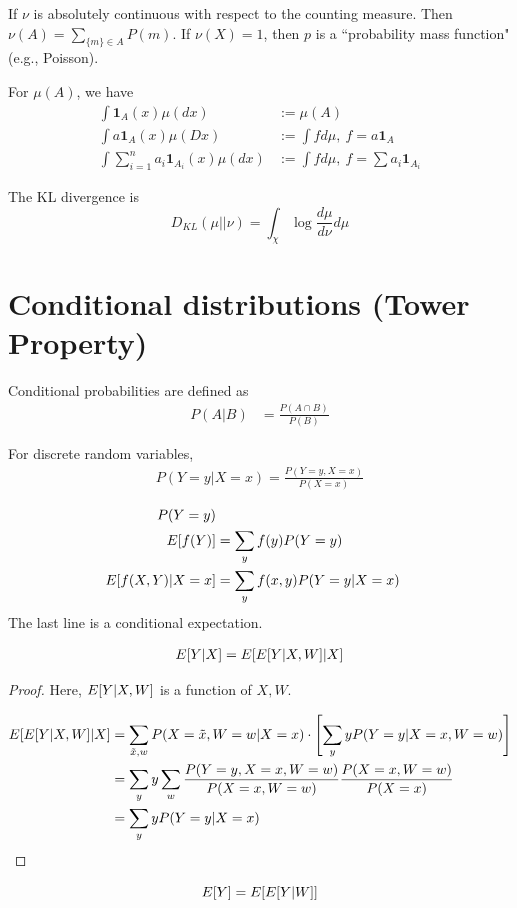 \documentclass[twoside]{article}
\begin{document}
\begin{example}
  If $\nu$ is absolutely continuous with respect to the counting measure. Then $\nu(A)
  = \sum_{\{m\} \in A} P(m)$.  If $\nu(X) = 1$, then $p$ is a ``probability mass
  function" (e.g., Poisson).
\end{example}

For $\mu(A)$, we have
\begin{align*}
   \int \mathbf{1}_A(x) \mu(dx) &:= \mu(A) \\
   \int a \mathbf{1}_A(x) \mu(Dx) &:= \int f d\mu,\ f = a \mathbf{1}_A \\
   \int \sum_{i=1}^n a_i \mathbf{1}_{A_i}(x) \mu(dx) &:= \int f d\mu,\ f = \sum
   a_i \mathbf{1}_{A_i}
\end{align*}

\begin{definition}
  The KL divergence is
  \[ D_{KL}(\mu || \nu) = \int_\chi \log \frac{d\mu}{d\nu} d\mu \]
\end{definition}

\section{Conditional distributions (Tower Property)}

Conditional probabilities are defined as
\begin{align*}
  P(A | B) &= \frac{P(A \cap B)}{P(B)} 
\end{align*}

For discrete random variables,
\begin{align*}
  P(Y = y | X = x) = \frac{P(Y = y, X = x)}{P(X = x)}
\end{align*}

\begin{align*}
  P(Y = y) \\
  E[f(Y)] &= \sum_y f(y) P(Y = y) \\
  E[f(X, Y) | X = x] &= \sum_y f(x, y) P(Y = y | X = x)
\end{align*}
The last line is a conditional expectation.

\begin{theorem}
\begin{align*}
  E[Y | X] = E[E[Y | X, W] | X]
\end{align*}
\end{theorem}
\begin{proof}
  Here, $E[Y | X, W]$ is a function of $X, W$. 

  \begin{align*}
    E[E[Y | X, W] | X] &= \sum_{\tilde{x}, w} P(X = \tilde{x}, W = w | X = x)
    \cdot \left[ \sum_y yP(Y = y | X = x, W = w)\right] \\
    &= \sum_y y \sum_w \frac{P(Y = y, X = x, W = w)}{P(X = x, W = w)}  \frac{P(X =
    x, W = w)}{P(X = x)} \\
    &= \sum_y y P(Y = y | X = x)
  \end{align*}
\end{proof}
\begin{corollary}
  \[E[Y] = E[E[Y | W]]\]
\end{corollary}
\end{document}
